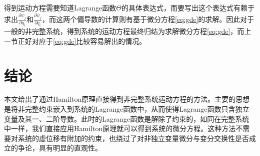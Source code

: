 \documentclass[a4paper,UTF8,11pt,hyperref]{ctexart}
\begin{document}
得到运动方程需要知道Lagrange函数$\Theta$的具体表达式，而要写出这个表达式有赖于求出$\frac{\partial \psi_j}{\partial q_i}$和$\frac{\partial \psi_j}{\partial \dot{q}_i}$，而这两个偏导数的计算则有基于微分方程\eqref{eq:gde}的求解。因此对于一般的非完整系统，得到系统的运动方程最终归结为求解微分方程\eqref{eq:gde}，而上一节正好对应于\eqref{eq:gde}比较容易解出的情况。


\section{结论}
本文给出了通过Hamilton原理直接得到非完整系统运动方程的方法。主要的思想是将非完整约束嵌入到系统的Lagrange函数中，从而使得Lagrange函数只含独立变量及其一、二阶导数。此时的Lagrange函数是解除了约束的，如同在完整系统中一样，我们直接应用Hamilton原理就可以得到系统的微分方程。这种方法不需要对系统的虚位移有附加的约束，也绕过了对非独立变量微分与变分交换性是否成立的争论，具有明显的直观性。








\end{document}
